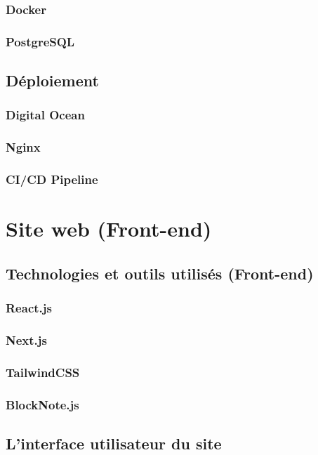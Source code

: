 \subsubsection{Docker}
\subsubsection{PostgreSQL}

\subsection{Déploiement}
\subsubsection{Digital Ocean}
\subsubsection{Nginx}
\subsubsection{CI/CD Pipeline}

\section{Site web (Front-end)}
\subsection{Technologies et outils utilisés (Front-end)}
\subsubsection{React.js}
\subsubsection{Next.js}
\subsubsection{TailwindCSS}
\subsubsection{BlockNote.js}

\subsection{L'interface utilisateur du site}
